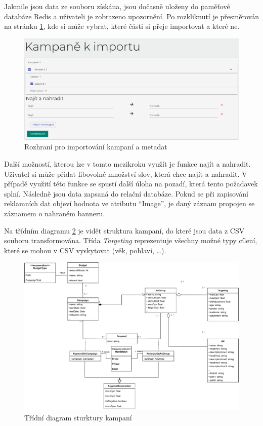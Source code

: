 Jakmile jsou data ze souboru získána, jsou dočasně uloženy do paměťové databáze Redis a uživateli je zobrazeno upozornění.
Po rozkliknutí je přesměrován na stránku \ref{fig:import-sar}, kde si může vybrat, které části si přeje importovat a které ne.

\begin{figure}[h]
    \centering
    \includegraphics[width=1\textwidth]{Figures/ui/import-sar.png}
    \caption{Rozhraní pro importování kampaní a metadat}
    \label{fig:import-sar}
\end{figure}

Další možností, kterou lze v tomto mezikroku využít je funkce najít a nahradit. Uživatel si může přidat libovolné množství
slov, která chce najít a nahradit. V případě využití této funkce se spustí další úloha na pozadí, která tento požadavek splní.
Následně jsou data zapsaná do relační databáze. Pokud se při zapisování reklamních dat objeví hodnota ve atributu \enquote{Image},
je daný záznam propojen se záznamem o nahraném banneru.

Na třídním diagramu \ref{fig:campaigns-class-diagram} je vidět struktura kampaní, do které jsou data z CSV souboru transformována. Třída \emph{Targeting} reprezentuje všechny
možné typy cílení, které se mohou v CSV vyskytovat (věk, pohlaví, \ldots). 

\begin{figure}[h]
    \centering
    \includegraphics[width=1\textwidth]{Figures/campaigns-class-diagram.pdf}
    \caption{Třídní diagram sturktury kampaní}
    \label{fig:campaigns-class-diagram}
\end{figure}


